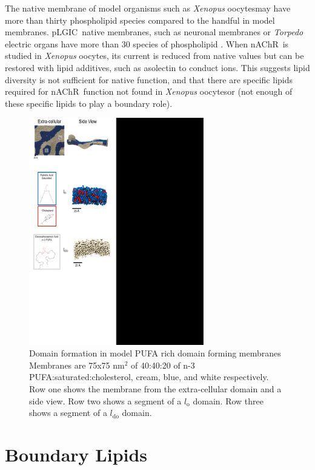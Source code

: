 \documentclass[12pt]{ruthesis_nofloat}
\newcommand{\lo}{l_{\mathrm{o}}}
\newcommand{\ldo}{l_{\mathrm{do}}}
\newcommand{\xo}{\textit{Xenopus} oocytes}
\newcommand{\nachr}{nAChR}
\newcommand{\plgic}{pLGIC}
\begin{document}
The native membrane of model organisms such as \xo may have more than thirty phospholipid species \citep{Gamba2005,Ferreira2010} compared to the handful in model membranes. \plgic~native membranes, such as neuronal membranes or \textit{Torpedo} electric organs have more than 30 species of phospholipid \citep{Isolated1969, Taguchi2010, Breckenridge1973,Ingolfsson2017b,Barrantes1989a,Quesada2016}. When \nachr~is studied in \textit{Xenopus} oocytes, its current is reduced from native values but can be restored with lipid additives, such as asolectin \citep{Regost2003} to conduct ions. This suggests lipid diversity is not sufficient for native function, and that there are specific lipids required for \nachr~function not found in \xo or (not enough of these specific lipids to play a boundary role). 
\begin{figure}[!h]
\center
	\includegraphics[width=3in]{Domains.pdf}
	\begin{flushleft}

	\caption[Domain formation in model PUFA rich domain forming membranes.] {Domain formation in model PUFA rich domain forming membranes Membranes are 75x75 nm$^2$ of 40:40:20 of n-3 PUFA:saturated:cholesterol, cream, blue, and white respectively. Row one shows the membrane from the extra-cellular domain and a side view. Row two shows a segment of a $\lo$ domain. Row three shows a segment of a $\ldo$ domain.}
	\end{flushleft}

	\label{fig:domain}
\end{figure}

\section{Boundary Lipids}
\end{document}
